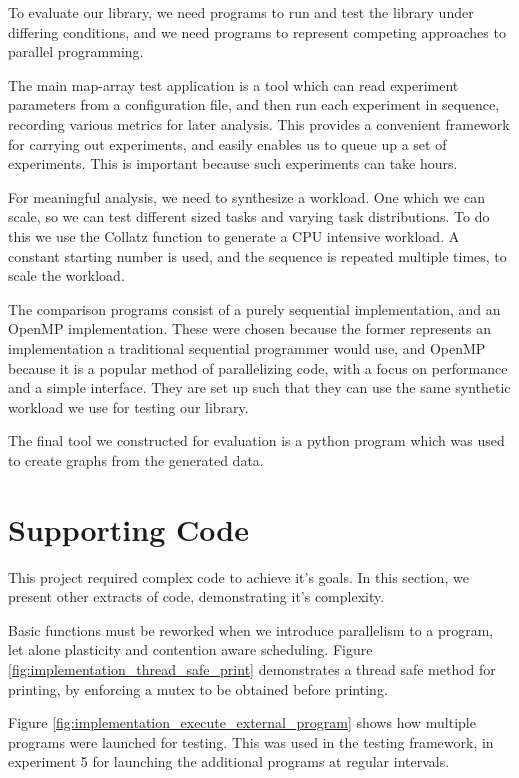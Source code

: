 To evaluate our library, we need programs to run and test the library under differing conditions, and we need programs to represent competing approaches to parallel programming. 

The main map-array test application is a tool which can read experiment parameters from a configuration file, and then run each experiment in sequence, recording various metrics for later analysis. This provides a convenient framework for carrying out experiments, and easily enables us to queue up a set of experiments. This is important because such experiments can take hours.

For meaningful analysis, we need to synthesize a workload. One which we can scale, so we can test different sized tasks and varying task distributions. To do this we use the Collatz function to generate a CPU intensive workload. A constant starting number is used, and the sequence is repeated multiple times, to scale the workload.

The comparison programs consist of a purely sequential implementation, and an OpenMP implementation. These were chosen because the former represents an implementation a traditional sequential programmer would use, and OpenMP because it is a popular method of parallelizing code, with a focus on performance and a simple interface. They are set up such that they can use the same synthetic workload we use for testing our library.

The final tool we constructed for evaluation is a python program which was used to create graphs from the generated data.



\section{Supporting Code}

This project required complex code to achieve it's goals. In this section, we present other extracts of code, demonstrating it's complexity. 

Basic functions must be reworked when we introduce parallelism to a program, let alone plasticity and contention aware scheduling. Figure \ref{fig:implementation_thread_safe_print} demonstrates a thread safe method for printing, by enforcing a mutex to be obtained before printing.

Figure \ref{fig:implementation_execute_external_program} shows how multiple programs were launched for testing. This was used in the testing framework, in experiment 5 for launching the additional programs at regular intervals.

